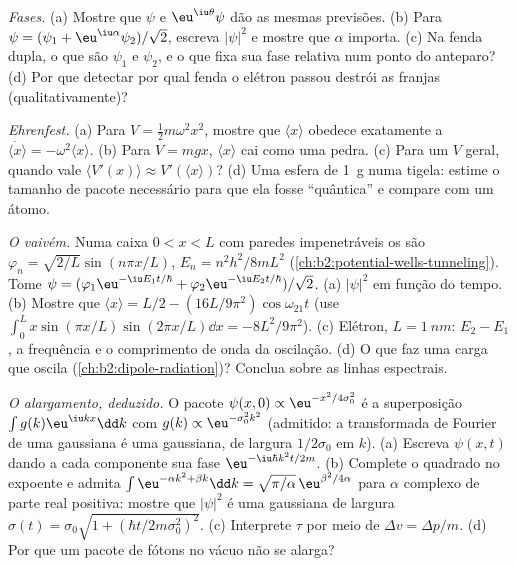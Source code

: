\begin{exercise}[$\star\star$]\label{exo:b2:schrodinger-wave-functions:8}
\emph{Fases.} (a) Mostre que $\psi$ e $\eu^{\iu\theta}\psi$ dão as mesmas
previsões. (b) Para $\psi = (\psi_1 + \eu^{\iu\alpha}\psi_2)/\sqrt2$, escreva
$|\psi|^2$ e mostre que $\alpha$ importa. (c) Na fenda dupla, o que
são $\psi_1$ e $\psi_2$, e o que fixa sua fase relativa num ponto
do anteparo? (d) Por que detectar por qual fenda o elétron passou
destrói as franjas (qualitativamente)?
\end{exercise}

\begin{exercise}[$\star\star$]\label{exo:b2:schrodinger-wave-functions:9}
\emph{Ehrenfest.} (a) Para $V = \tfrac12m\omega^2x^2$, mostre que $\langle
x\rangle$ obedece exatamente a $\ddot{\langle x\rangle} = -\omega^2\langle x\rangle$.
(b) Para $V = mgx$, $\langle x\rangle$ cai como uma pedra. (c) Para um $V$
geral, quando vale $\langle V'(x)\rangle \approx V'(\langle x\rangle)$? (d) Uma
esfera de \qty{1}{g} numa tigela: estime o tamanho de pacote necessário para
que ela fosse ``quântica'' e compare com um átomo.
\end{exercise}

\begin{exercise}[$\star\star\star$]\label{exo:b2:schrodinger-wave-functions:10}
\emph{O vaivém.} Numa caixa $0 < x < L$ com paredes impenetráveis os
 são $\varphi_n = \sqrt{2/L}\sin(n\pi x/L)$, $E_n =
n^2h^2/8mL^2$ (\cref{ch:b2:potential-wells-tunneling}). Tome $\psi =
(\varphi_1\eu^{-\iu E_1t/\hbar} + \varphi_2\eu^{-\iu E_2t/\hbar})/\sqrt2$. (a)
$|\psi|^2$ em função do tempo. (b) Mostre que $\langle x\rangle = L/2 -
(16L/9\pi^2)\cos\omega_{21}t$ (use $\int_0^L x\sin(\pi x/L)\sin(2\pi x/L)\dd x
= -8L^2/9\pi^2$). (c) Elétron, $L = \qty{1}{nm}$: $E_2 - E_1$, a
frequência e o comprimento de onda da oscilação. (d) O que faz uma carga
que oscila (\cref{ch:b2:dipole-radiation})? Conclua sobre as
linhas espectrais.
\end{exercise}

\begin{exercise}[$\star\star\star$]\label{exo:b2:schrodinger-wave-functions:11}
\emph{O alargamento, deduzido.} O pacote $\psi(x,0) \propto \eu^{-x^2/4\sigma_0^2}$
é a superposição $\int g(k)\eu^{\iu kx}\dd k$ com $g(k) \propto
\eu^{-\sigma_0^2k^2}$ (admitido: a transformada de Fourier de uma gaussiana é uma
gaussiana, de largura $1/2\sigma_0$ em $k$). (a) Escreva $\psi(x,t)$ dando a cada
componente sua fase $\eu^{-\iu\hbar k^2t/2m}$. (b) Complete o quadrado no
expoente e admita $\int\eu^{-\alpha k^2 + \beta k}\dd k = \sqrt{\pi/\alpha}\,
\eu^{\beta^2/4\alpha}$ para $\alpha$ complexo de parte real positiva: mostre que
$|\psi|^2$ é uma gaussiana de largura $\sigma(t) = \sigma_0\sqrt{1 + (\hbar t/2m
\sigma_0^2)^2}$. (c) Interprete $\tau$ por meio de $\Delta v = \Delta p/m$. (d) Por que
um pacote de fótons no vácuo não se alarga?
\end{exercise}

